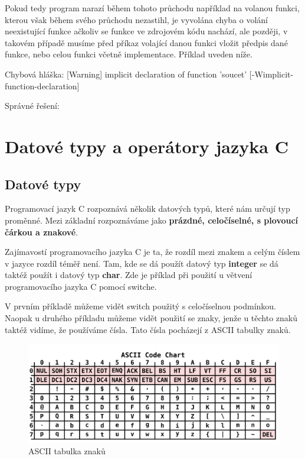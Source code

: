 \documentclass[twoside,a4paper]{article} %
\begin{document}
Pokud tedy program narazí během tohoto průchodu například na volanou funkci, kterou však během svého průchodu nezastihl, je vyvolána chyba o volání neexistující funkce ačkoliv se funkce ve zdrojovém kódu nachází, ale později, v takovém případě musíme před příkaz volající danou funkci vložit předpis dané funkce, nebo celou funkci včetně implementace. Příklad uveden níže.



Chybová hláška: [Warning]  implicit declaration of function 'soucet' [-Wimplicit-function-declaration]

Správné řešení:


\section{Datové typy a operátory jazyka C}
\subsection{Datové typy}
Programovací jazyk C rozpoznává několik datových typů, které nám určují typ proměnné. Mezi základní rozpoznáváme jako \textbf{prázdné, celočíselné, s plovoucí čárkou a znakové}. 


Zajímavostí programovacího jazyka C je ta, že rozdíl mezi znakem a celým číslem v jazyce rozdíl téměř není. Tam, kde se dá použít datový typ \textbf{integer} se dá taktéž použít i datový typ \textbf{char}. Zde je příklad při použití u větvení programovacího jazyka C pomocí switche.




V prvním příkladě můžeme vidět switch použitý s celočíselnou podmínkou. Naopak u druhého příkladu můžeme vidět použití se znaky, jenže u těchto znaků taktéž vidíme, že používáme čísla. Tato čísla pocházejí z ASCII tabulky znaků.

\begin{figure}[H]
    \centering
    \includegraphics[width=0.5\linewidth]{ASCII.png}
    \caption{ASCII tabulka znaků}
    \label{fig:asciiTable}
\end{figure}
\end{document}
